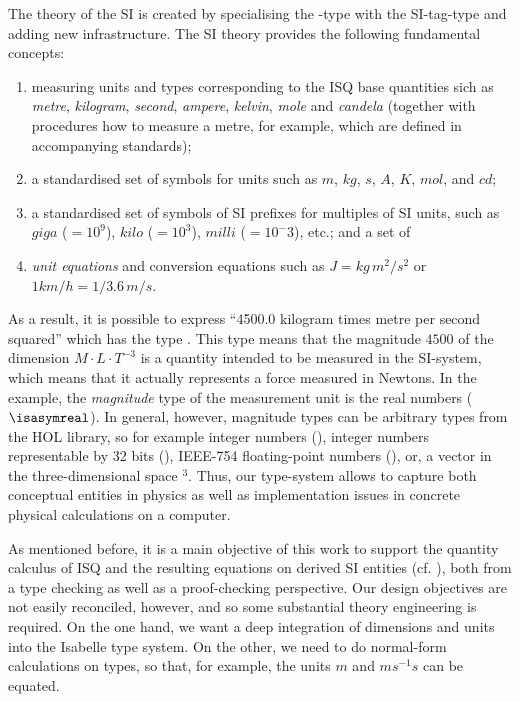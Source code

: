 \documentclass[11pt,a4paper]{book}
\begin{document}
The theory of the SI is created by specialising the -type with the 
SI-tag-type and adding new infrastructure. The SI theory provides the following fundamental 
concepts:
\begin{enumerate}%
\item measuring units and types corresponding to the ISQ base quantities sich
      as \emph{metre}, \emph{kilogram}, \emph{second}, \emph{ampere}, \emph{kelvin}, \emph{mole} and
      \emph{candela} (together with procedures how to measure a metre, for example, which are
      defined in accompanying standards);
\item a standardised set of symbols for units such as $m$, $kg$, $s$, $A$, $K$, $mol$, and $cd$;
\item a standardised set of symbols of SI prefixes for multiples of SI units, such as 
      $giga$ ($=10^9$), $kilo$ ($=10^3$), $milli$ ($=10^-3$), etc.; and a set of
\item \emph{unit equations} and conversion equations such as $J = kg\,m^2/s^2$ or $1 km/h = 1/3.6\,m/s$.
\end{enumerate}

As a result, it is possible to express ``4500.0 kilogram times metre per second squared'' which has the type
.  This type means that
the magnitude $4500$ of the dimension $M \cdot L \cdot T^{- 3}$ is a quantity intended to be measured in the SI-system,
which means that it actually represents a force measured in Newtons.
In the example, the \emph{magnitude} type of the measurement unit is the real numbers ($\isasymreal$).  In general,
however, magnitude types can be arbitrary types from the HOL library, so for example integer numbers (),
integer numbers representable by 32 bits (), IEEE-754 floating-point numbers (), or, a vector in
the three-dimensional space \isa{\isasymreal}$^3$. Thus, our type-system allows to capture both conceptual entities in
physics as well as implementation issues in concrete physical calculations on a computer.

As mentioned before, it is a main objective of this work to support the quantity calculus of ISQ and the resulting
equations on derived SI entities (cf. \cite{SI-Brochure}), both from a type checking as well as a proof-checking
perspective. Our design objectives are not easily reconciled, however, and so some substantial theory engineering is
required. On the one hand, we want a deep integration of dimensions and units into the Isabelle type system. On the
other, we need to do normal-form calculations on types, so that, for example, the units $m$ and $ms^{-1}s$ can be
equated.
\end{document}
